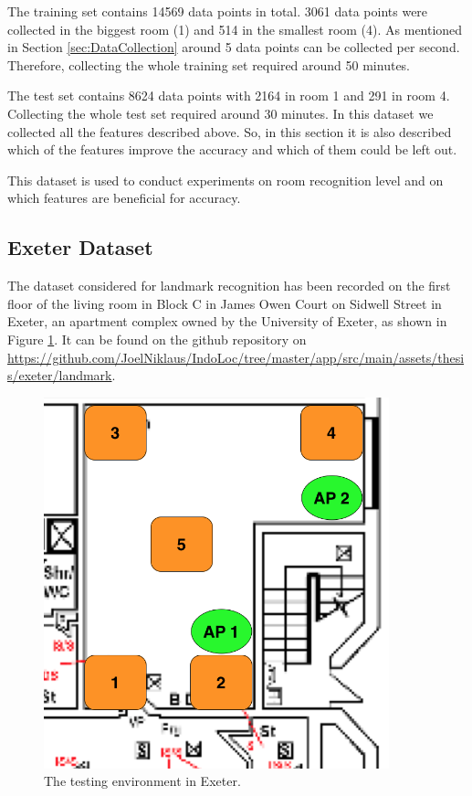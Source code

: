 The training set contains 14569 data points in total. 3061 data points were collected in the biggest room (1) and 514 in the smallest room (4). As mentioned in Section \ref{sec:DataCollection} around 5 data points can be collected per second. Therefore, collecting the whole training set required around 50 minutes.

The test set contains 8624 data points with 2164 in room 1 and 291 in room 4. Collecting the whole test set required around 30 minutes.
In this dataset we collected all the features described above. So, in this section it is also described which of the features improve the accuracy and which of them could be left out.

This dataset is used to conduct experiments on room recognition level and on which features are beneficial for accuracy.

\subsection{Exeter Dataset}
\label{sec:ExeterDataset}
The dataset considered for landmark recognition has been recorded on the first floor of the living room in Block C in James Owen Court on Sidwell Street in Exeter, an apartment complex owned by the University of Exeter, as shown in Figure \ref{fig:Exeter}. It can be found on the github repository on \url{https://github.com/JoelNiklaus/IndoLoc/tree/master/app/src/main/assets/thesis/exeter/landmark}.

\begin{figure}[H]
\centering
\includegraphics[width=100mm]{Figures/Exeter.jpg}
\decoRule
\caption[Exeter]{The testing environment in Exeter.}
\label{fig:Exeter}
\end{figure}



